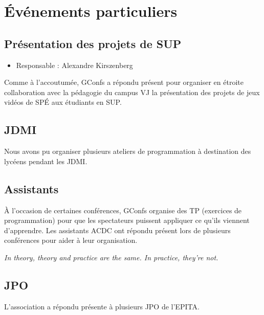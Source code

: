\documentclass[12pt,a4paper]{article}
\begin{document}
\newpage

\section{Événements particuliers}

\subsection{Présentation des projets de SUP}

\begin{itemize}
\item Responsable : Alexandre Kirszenberg
\end{itemize}

Comme à l'accoutumée, GConfs a répondu présent pour organiser en étroite collaboration avec la pédagogie du campus VJ la présentation des projets de jeux vidéos de SPÉ aux étudiants en SUP.

\subsection{JDMI}

Nous avons pu organiser plusieurs ateliers de programmation à destination des lycéens pendant les JDMI.

\subsection{Assistants}

À l'occasion de certaines conférences, GConfs organise des TP (exercices de programmation) pour que les spectateurs puissent appliquer ce qu'ils viennent d'apprendre. Les assistants ACDC ont répondu présent lors de plusieurs conférences pour aider à leur organisation.

\textit{In theory, theory and practice are the same. In practice, they're not.}

\subsection{JPO}

L'association a répondu présente à plusieurs JPO de l'EPITA.
\end{document}
